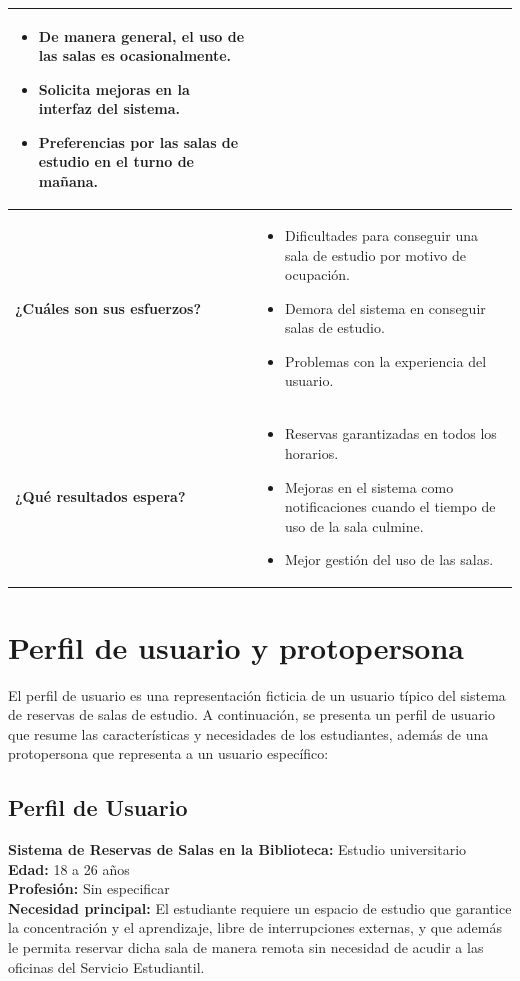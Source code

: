 \documentclass{article}
\begin{document}
\begin{center}
\begin{tabular}{|>{\centering\arraybackslash}m{3cm}|>{\centering\arraybackslash}p{11cm}|}
\begin{itemize}[leftmargin=*, label={--}]
      \item De manera general, el uso de las salas es ocasionalmente.
      \item Solicita mejoras en la interfaz del sistema.
      \item Preferencias por las salas de estudio en el turno de mañana.
    \end{itemize} \\ \hline
    \textbf{¿Cuáles son sus esfuerzos?} & 
    \begin{itemize}[leftmargin=*, label={--}]
      \item Dificultades para conseguir una sala de estudio por motivo de ocupación.
      \item Demora del sistema en conseguir salas de estudio.
      \item Problemas con la experiencia del usuario.
    \end{itemize} \\ \hline
    \textbf{¿Qué resultados espera?} & 
    \begin{itemize}[leftmargin=*, label={--}]
      \item Reservas garantizadas en todos los horarios.
      \item Mejoras en el sistema como notificaciones cuando el tiempo de uso de la sala culmine.
      \item Mejor gestión del uso de las salas.
    \end{itemize} \\ \hline
  \end{tabular}
\end{center}

\newpage

\section{Perfil de usuario y protopersona}

El perfil de usuario es una representación ficticia de un usuario típico del sistema de reservas de salas de estudio. A continuación, se presenta un perfil de usuario que resume las características y necesidades de los estudiantes, además de una protopersona que representa a un usuario específico:

\subsection{Perfil de Usuario}

\textbf{Sistema de Reservas de Salas en la Biblioteca:} Estudio universitario \\
\textbf{Edad:} 18 a 26 años \\
\textbf{Profesión:} Sin especificar \\
\textbf{Necesidad principal:} El estudiante requiere un espacio de estudio que garantice la concentración y el aprendizaje, libre de interrupciones externas, y que además le permita reservar dicha sala de manera remota sin necesidad de acudir a las oficinas del Servicio Estudiantil.
\end{document}
